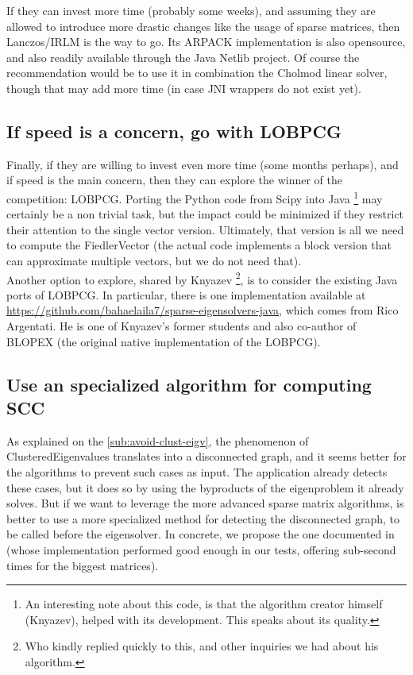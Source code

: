 If they can invest more time (probably some weeks), and assuming
they are allowed to introduce more drastic changes like the usage of
sparse matrices, then Lanczos/\gls{IRLM} is the way to go. Its ARPACK
implementation is also opensource, and also readily available through
the Java Netlib project. Of course the recommendation would be to use
it in combination
the \gls{Cholmod} linear solver, though that may add more time (in case JNI
wrappers do not exist yet).

\subsection{If speed is a concern, go with \gls{LOBPCG}}

Finally, if they are willing to invest even more time (some months
perhaps),  and if speed is the
main concern, then they can explore the winner of the competition:
\gls{LOBPCG}. Porting the Python code from Scipy into Java \footnote{An
  interesting note about this code, is that the algorithm creator
  himself (Knyazev), helped with its development. This speaks about
  its quality.} may certainly be a non trivial task, but the impact
could be minimized if they restrict their attention to the single
vector version. Ultimately, that version is all we need to compute the
\gls{FiedlerVector} (the   
actual code implements a block version that can approximate multiple
vectors, but we do not need that). \\

Another option to explore, shared by Knyazev \footnote{Who kindly
  replied quickly to this, and other inquiries we had about his
  algorithm.}, is to consider the existing Java ports of
\gls{LOBPCG}. In particular, there is one implementation
available at
\url{https://github.com/bahaelaila7/sparse-eigensolvers-java}, which
comes from Rico Argentati. He is one of Knyazev's former students and also
co-author of BLOPEX \cite{blopex} (the original native
implementation of the \gls{LOBPCG}).

\subsection{Use an specialized algorithm for computing SCC}

As explained on the \cref{sub:avoid-clust-eigv}, the phenomenon of
\gls{ClusteredEigenvalues} translates into a disconnected graph, and
it seems better for the algorithms to prevent such cases as input. The
application already detects these cases, but it does so by using the
byproducts of the eigenproblem it already solves. But if we want to
leverage the more advanced sparse matrix algorithms, is better to use
a more specialized method for detecting the disconnected graph, to
be called before the eigensolver. In
concrete, we propose the one documented in \cite{pearce05} (whose
implementation performed good enough in our tests, offering sub-second
times for the biggest matrices). 

